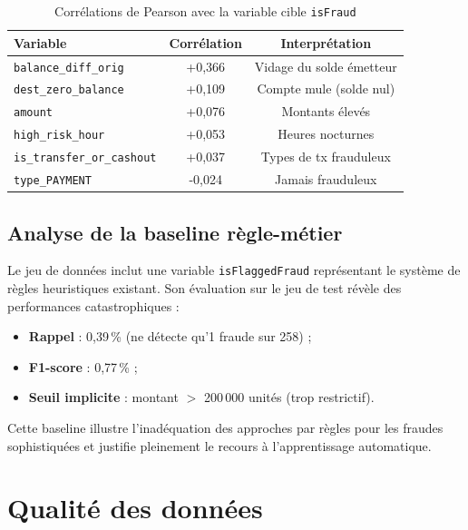 \documentclass[12pt,a4paper,twoside]{report}
\theoremstyle{definition}
\begin{document}
\begin{table}[H]
\centering
\caption{Corrélations de Pearson avec la variable cible \texttt{isFraud}}
\label{tab:correlations}
\renewcommand{\arraystretch}{1.3}
\begin{tabular}{lcc}
\toprule
\textbf{Variable} & \textbf{Corrélation} & \textbf{Interprétation} \\
\midrule
\texttt{balance\_diff\_orig}    & +0,366 & Vidage du solde émetteur \\
\texttt{dest\_zero\_balance}    & +0,109 & Compte mule (solde nul) \\
\texttt{amount}                 & +0,076 & Montants élevés \\
\texttt{high\_risk\_hour}       & +0,053 & Heures nocturnes \\
\texttt{is\_transfer\_or\_cashout} & +0,037 & Types de tx frauduleux \\
\texttt{type\_PAYMENT}          & -0,024 & Jamais frauduleux \\
\bottomrule
\end{tabular}
\end{table}

\subsection{Analyse de la baseline règle-métier}

Le jeu de données inclut une variable \texttt{isFlaggedFraud} représentant le
système de règles heuristiques existant. Son évaluation sur le jeu de test révèle
des performances catastrophiques :

\begin{itemize}
  \item \textbf{Rappel} : 0,39\,\% (ne détecte qu'1 fraude sur 258) ;
  \item \textbf{F1-score} : 0,77\,\% ;
  \item \textbf{Seuil implicite} : montant $>$ 200\,000 unités (trop restrictif).
\end{itemize}

Cette baseline illustre l'inadéquation des approches par règles pour les fraudes
sophistiquées et justifie pleinement le recours à l'apprentissage automatique.

\section{Qualité des données}
\end{document}
